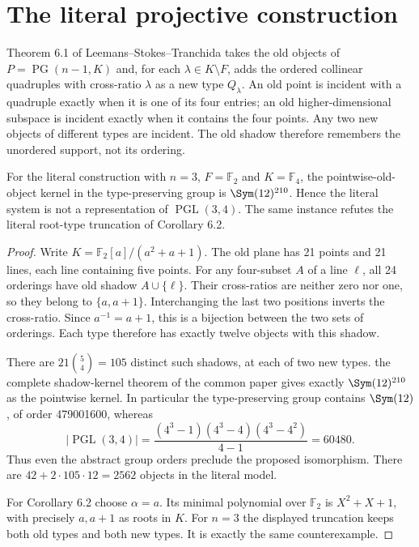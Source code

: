 \section{The literal projective construction}
Theorem 6.1 of Leemans--Stokes--Tranchida takes the old objects of
$P=\operatorname{PG}(n-1,K)$ and, for each $\lambda\in K\setminus F$,
adds the ordered collinear quadruples with cross-ratio $\lambda$ as a
new type $Q_\lambda$. An old point is incident with a quadruple exactly
when it is one of its four entries; an old higher-dimensional subspace
is incident exactly when it contains the four points. Any two new
objects of different types are incident. The old shadow therefore
remembers the unordered support, not its ordering.

\begin{theorem}\label{A126.Projective}
For the literal construction with $n=3$, $F=\mathbb F_2$ and
$K=\mathbb F_4$, the pointwise-old-object kernel in the type-preserving
group is $\Sym(12)^{210}$. Hence the literal system is not a
representation of $\operatorname{PGL}(3,4)$. The same instance refutes
the literal root-type truncation of Corollary 6.2.
\end{theorem}
\begin{proof}
Write $K=\mathbb F_2[a]/(a^2+a+1)$. The old plane has 21 points and
21 lines, each line containing five points. For any four-subset $A$ of
a line $\ell$, all 24 orderings have old shadow $A\cup\{\ell\}$.
Their cross-ratios are neither zero nor one, so they belong to
$\{a,a+1\}$. Interchanging the last two positions inverts the
cross-ratio. Since $a^{-1}=a+1$, this is a bijection between the two
sets of orderings. Each type therefore has exactly twelve objects
with this shadow.

There are $21\binom54=105$ distinct such shadows, at each of two
new types. the complete shadow-kernel theorem of the common paper gives exactly
$\Sym(12)^{210}$ as the pointwise kernel. In particular the
type-preserving group contains $\Sym(12)$, of order 479001600,
whereas
\[
 |\operatorname{PGL}(3,4)|=
 \frac{(4^3-1)(4^3-4)(4^3-4^2)}{4-1}=60480.
\]
Thus even the abstract group orders preclude the proposed isomorphism.
There are $42+2\cdot105\cdot12=2562$ objects in the literal model.

For Corollary 6.2 choose $\alpha=a$. Its minimal polynomial over
$\mathbb F_2$ is $X^2+X+1$, with precisely $a,a+1$ as roots in $K$.
For $n=3$ the displayed truncation keeps both old types and both new
types. It is exactly the same counterexample.
\end{proof}

